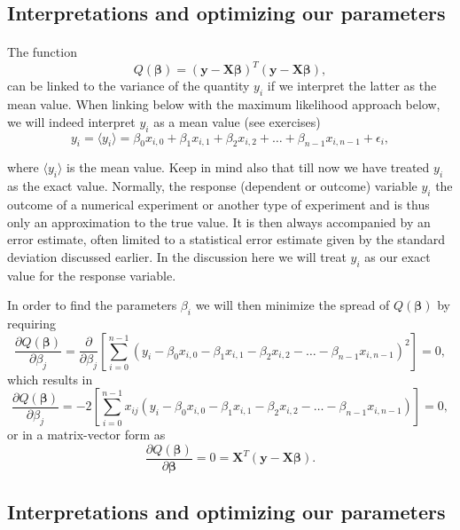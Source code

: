 \documentclass[%
oneside,                 %
final,                   %
10pt]{article}
\begin{document}
\subsection{Interpretations and optimizing our parameters}

\paragraph{}

The function 
\[
Q(\bm{\beta})=\left(\bm{y}-\bm{X}\bm{\beta}\right)^T\left(\bm{y}-\bm{X}\bm{\beta}\right),
\]
can be linked to the variance of the quantity $y_i$ if we interpret the latter as the mean value. 
When linking below with the maximum likelihood approach below, we will indeed interpret $y_i$ as a mean value (see exercises)
\[
y_{i}=\langle y_i \rangle = \beta_0x_{i,0}+\beta_1x_{i,1}+\beta_2x_{i,2}+\dots+\beta_{n-1}x_{i,n-1}+\epsilon_i,
\]

where $\langle y_i \rangle$ is the mean value. Keep in mind also that
till now we have treated $y_i$ as the exact value. Normally, the
response (dependent or outcome) variable $y_i$ the outcome of a
numerical experiment or another type of experiment and is thus only an
approximation to the true value. It is then always accompanied by an
error estimate, often limited to a statistical error estimate given by
the standard deviation discussed earlier. In the discussion here we
will treat $y_i$ as our exact value for the response variable.

In order to find the parameters $\beta_i$ we will then minimize the spread of $Q(\bm{\beta})$ by requiring
\[
\frac{\partial Q(\bm{\beta})}{\partial \beta_j} = \frac{\partial }{\partial \beta_j}\left[ \sum_{i=0}^{n-1}\left(y_i-\beta_0x_{i,0}-\beta_1x_{i,1}-\beta_2x_{i,2}-\dots-\beta_{n-1}x_{i,n-1}\right)^2\right]=0, 
\]
which results in
\[
\frac{\partial Q(\bm{\beta})}{\partial \beta_j} = -2\left[ \sum_{i=0}^{n-1}x_{ij}\left(y_i-\beta_0x_{i,0}-\beta_1x_{i,1}-\beta_2x_{i,2}-\dots-\beta_{n-1}x_{i,n-1}\right)\right]=0, 
\]
or in a matrix-vector form as
\[
\frac{\partial Q(\bm{\beta})}{\partial \bm{\beta}} = 0 = \bm{X}^T\left( \bm{y}-\bm{X}\bm{\beta}\right).  
\]




\subsection{Interpretations and optimizing our parameters}
\end{document}
